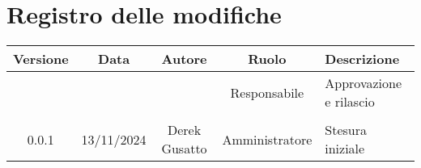 
\section*{Registro delle modifiche}
\begin{table}[H]
    \begin{tabular}{|c|c|c|c|p{5cm}|}
        \hline
         \textbf{Versione} &  \textbf{Data} &  \textbf{Autore} &  \textbf{Ruolo} & \textbf{Descrizione} \\
          \hline
          &  &  & Responsabile & Approvazione e rilascio\\
          \hline
          &  &  &  &  \\
          \hline
           0.0.1 & 13/11/2024 & Derek Gusatto & Amministratore  & Stesura iniziale \\
          \hline
    \end{tabular}
\end{table}